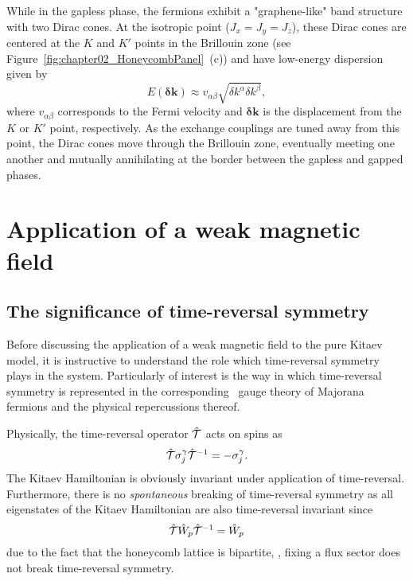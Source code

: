 While in the gapless phase, the fermions exhibit a "graphene-like" band structure with two Dirac cones.
At the isotropic point ($J_x = J_y = J_z$), these Dirac cones are centered at the $K$ and $K'$ points in the Brillouin zone (see Figure~\ref{fig:chapter02_HoneycombPanel}~(c)) and have low-energy dispersion given by
%
\begin{equation}
	E(\mathbf{\delta k}) \approx v_{\alpha\beta} \sqrt{\delta k^{\alpha} \delta k^{\beta}},
\end{equation}
%
where $v_{\alpha\beta}$ corresponds to the Fermi velocity and $\mathbf{\delta k}$ is the displacement from the $K$ or $K'$ point, respectively.
As the exchange couplings are tuned away from this point, the Dirac cones move through the Brillouin zone, eventually meeting one another and mutually annihilating at the border between the gapless and gapped phases.


%
%
\section{Application of a weak magnetic field}
\label{section:chapter02_WeakMagneticField}
%
%
\subsection{The significance of time-reversal symmetry}
%
%
Before discussing the application of a weak magnetic field to the pure Kitaev model, it is instructive to understand the role which time-reversal symmetry plays in the system.
Particularly of interest is the way in which time-reversal symmetry is represented in the corresponding \ZZ~gauge theory of Majorana fermions and the physical repercussions thereof.

Physically, the time-reversal operator $\hat{\mathcal{T}}$ acts on spins as
%
\begin{equation}
	\hat{\mathcal{T}} \sigma_j^{\gamma} \hat{\mathcal{T}}^{-1} = -\sigma_j^{\gamma}.
\end{equation}
%
The Kitaev Hamiltonian is obviously invariant under application of time-reversal.
Furthermore, there is no \textit{spontaneous} breaking of time-reversal symmetry as all eigenstates of the Kitaev Hamiltonian are also time-reversal invariant since
%
\begin{equation}
	\hat{\mathcal{T}} \hat{W}_p \hat{\mathcal{T}}^{-1} = \hat{W}_p
\end{equation}
%
due to the fact that the honeycomb lattice is bipartite, \ie, fixing a flux sector does not break time-reversal symmetry.


